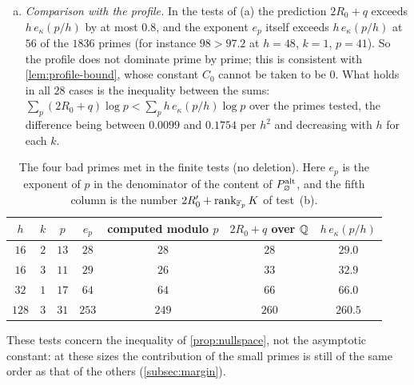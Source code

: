 \begin{enumerate}[(a)]
  $p>p_0$ only. With the rational data the inequality $e_p\le2R_0+q$ holds at all four bad primes,
  for the Gauss valuation and at the points $X\in\{0,1,\frac17,\frac23,\frac3{11}\}$. The rank
  drops are explicit: for $p=31$ the block of the type with four common digits, $\kappa=\frac35$ and
  $\varepsilon=(1,1)$ is a $4\times4$ matrix of rank $4$ whose determinant has numerator divisible
  by $31$, and this type occurs in the eleven fibres $20\le\iota\le30$; for $p=11$ and $p=13$ it
  is the $1\times1$ block $W_0=4-\kappa^{-2}$, equal to $\frac{11}9$ and $\frac{39}{16}$; for
  $p=17$ a $2\times2$ block of determinant $\frac{17}3$.
  \item \emph{Comparison with the profile.} In the tests of (a) the prediction $2R_0+q$ exceeds
  $h\,e_\kappa(p/h)$ by at most $0.8$, and the exponent $e_p$ itself exceeds $h\,e_\kappa(p/h)$ at
  $56$ of the $1836$ primes (for instance $98>97.2$ at $h=48$, $k=1$, $p=41$). So the profile does
  not dominate prime by prime; this is consistent with \cref{lem:profile-bound}, whose constant
  $C_0$ cannot be taken to be $0$. What holds in all $28$ cases is the inequality between the
  sums: $\sum_p(2R_0+q)\log p<\sum_ph\,e_\kappa(p/h)\log p$ over the primes tested, the difference
  being between $0.0099$ and $0.1754$ per $h^2$ and decreasing with $h$ for each $k$.
\end{enumerate}

\begin{table}[ht]
\centering
\small
\begin{tabular}{@{}ccccccc@{}}
\toprule
$h$ & $k$ & $p$ & $e_p$ & computed modulo $p$ & $2R_0+q$ over $\mathbb{Q}$ & $h\,e_\kappa(p/h)$\\
\midrule
$16$ & $2$ & $13$ & $28$ & $28$ & $28$ & $29.0$\\
$16$ & $3$ & $11$ & $29$ & $26$ & $33$ & $32.9$\\
$32$ & $1$ & $17$ & $64$ & $64$ & $66$ & $66.0$\\
$128$ & $3$ & $31$ & $253$ & $249$ & $260$ & $260.5$\\
\bottomrule
\end{tabular}
\caption{The four bad primes met in the finite tests (no deletion). Here $e_p$ is the exponent of
$p$ in the denominator of the content of $P^{\mathrm{alt}}_\varnothing$, and the fifth column is the
number $2R'_0+\operatorname{rank}_{\mathbb{F}_p}K$ of test~(b).}
\label{tab:bad-primes}
\end{table}

These tests concern the inequality of \cref{prop:nullspace}, not the asymptotic constant: at
these sizes the contribution of the small primes is still of the same order as that of the
others (\cref{subsec:margin}).
